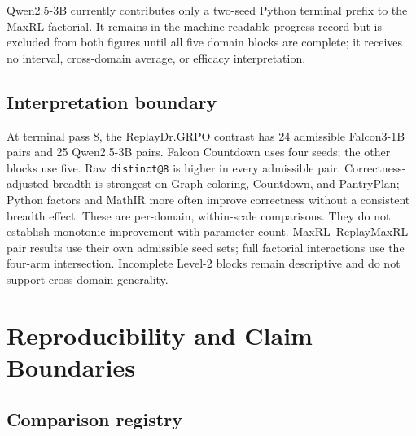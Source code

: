 Qwen2.5-3B currently contributes only a two-seed Python terminal prefix to the
MaxRL factorial. It remains in the machine-readable progress record but is
excluded from both figures until all five domain blocks are complete; it
receives no interval, cross-domain average, or efficacy interpretation.

\subsection{Interpretation boundary}
\label{app:scale-boundary}

At terminal pass 8, the ReplayDr.GRPO contrast has 24 admissible Falcon3-1B
pairs and 25 Qwen2.5-3B pairs. Falcon Countdown uses four seeds; the other
blocks use five. Raw \texttt{distinct@8} is higher in every admissible pair. Correctness-adjusted
breadth is strongest on Graph coloring, Countdown, and PantryPlan; Python
factors and MathIR more often improve correctness without a consistent breadth effect. These are per-domain,
within-scale comparisons. They do not establish monotonic improvement with
parameter count. MaxRL--ReplayMaxRL pair results use their own admissible seed sets;
full factorial interactions use the four-arm intersection. Incomplete Level-2
blocks remain descriptive and do not support cross-domain generality.

\section{Reproducibility and Claim Boundaries}
\label{app:reproducibility}

\subsection{Comparison registry}
\label{app:program-registry}

